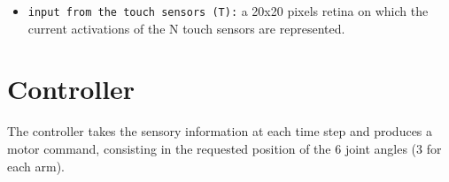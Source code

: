 \documentclass[11pt]{article}
\begin{document}
\begin{itemize}
\begin{itemize}

%

            \item \texttt{input from the touch sensors (T):}
                a 20x20 pixels retina on which the current
                activations of the N touch sensors are
                represented.

%
%
%
%
%
%

        \end{itemize}

\end{itemize}



\section{Controller} 
\label{sec:controller}

The controller takes the sensory information at each time
step and produces a motor command, consisting in the
requested position of the 6 joint angles (3 for each arm).
\end{document}
